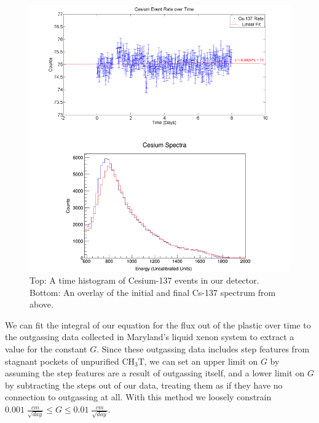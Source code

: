 \begin{figure}[h]
\centering
\includegraphics[scale=0.3]{Cesium_Combined_Fit.png}
\caption{Top: A time histogram of Cesium-137 events in our detector. Bottom: An overlay of the initial and final Cs-137 spectrum from above.}
\label{fig:CsFit}
\end{figure}

We can fit the integral of our equation for the flux out of the plastic over time to the outgassing data collected in Maryland's liquid xenon system to extract a value for the constant $G$. Since these outgassing data includes step features from stagnant pockets of unpurified CH$_3$T, we can set an upper limit on $G$ by assuming the step features are a result of outgassing itself, and a lower limit on $G$ by subtracting the steps out of our data, treating them as if they have no connection to outgassing at all. With this method we loosely constrain $0.001 \; \frac{cm}{\sqrt{day}} \leq G \leq 0.01 \; \frac{cm}{\sqrt{day}}.$ 

